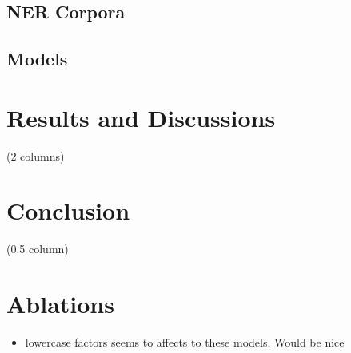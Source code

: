 \documentclass{article}
\begin{document}
\subsection{NER Corpora}

\subsection{Models}

\section{Results and Discussions}
\label{sec:experimental_results}
(2 columns)

\section{Conclusion}
\label{sec:conclusion}
(0.5 column)

\section{Ablations}

\begin{itemize}
    \item lowercase factors seems to affects to these models. Would be nice
\end{itemize} 



\end{document}
